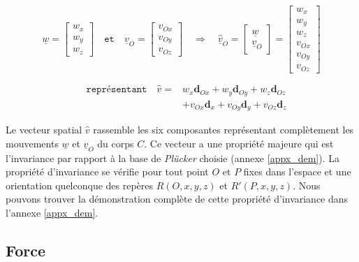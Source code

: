 \documentclass{report}
\begin{document}
\begin{minipage}[c]{.55\textwidth}
$$
\underline{w}=
\begin{bmatrix}
w_{x} \\
w_{y} \\
w_{z}
\end{bmatrix}
\quad \texttt{et} \quad
\underline{v}_{O}=
\begin{bmatrix}
v_{Ox} \\
v_{Oy} \\
v_{Oz}
\end{bmatrix}
\quad \Rightarrow \quad
\underline{\widehat{v}}_{O}=
\begin{bmatrix}
\underline{w} \\
\underline{v}_{O}
\end{bmatrix}
=
\begin{bmatrix}
w_{x} \\
w_{y} \\
w_{z} \\
v_{Ox} \\
v_{Oy} \\
v_{Oz}
\end{bmatrix}
$$
\end{minipage}
\begin{minipage}[c]{.45\textwidth}
\begin{align*}
\quad \texttt{représentant} \quad
\widehat{v} = 
  &w_{x}\textbf{d}_{Ox} + w_{y}\textbf{d}_{Oy} + w_{z}\textbf{d}_{Oz} \\
  &+ v_{Ox}\textbf{d}_{x} + v_{Oy}\textbf{d}_{y} + v_{Oz}\textbf{d}_{z}
\end{align*}
\end{minipage}

\vspace{0.3cm} %

Le vecteur spatial $\widehat{v}$ rassemble les six composantes représentant complètement les mouvements $\underline{w}$ et $\underline{v}_{O}$ du corps $C$. Ce vecteur a une propriété majeure qui est l'invariance par rapport à la base de \emph{Plücker} choisie (annexe \ref{appx_dem}). La propriété d'invariance se vérifie pour tout point $O$ et $P$ fixes dans l'espace et une orientation quelconque des repères $R(O,x,y,z)$ et $R'(P,x,y,z)$. Nous pouvons trouver la démonstration complète de cette propriété d'invariance dans l'annexe \ref{appx_dem}.


\subsection{Force}
\end{document}
